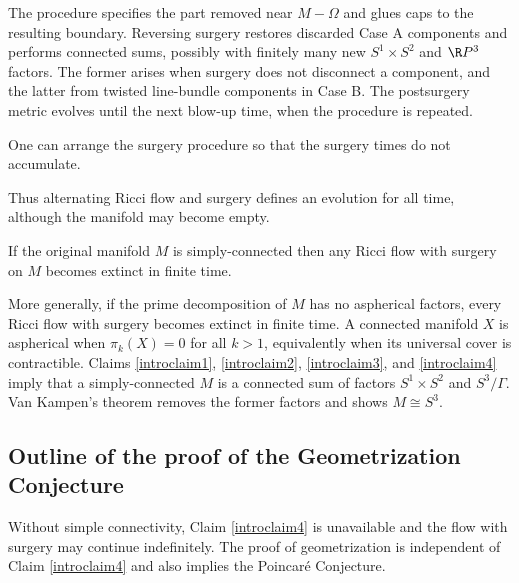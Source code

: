 The procedure specifies the part removed near $M-\Omega$ and glues caps to
the resulting boundary.  Reversing surgery restores discarded Case A
components and performs connected sums, possibly with finitely many new
$S^1\times S^2$ and $\R P^3$ factors.  The former arises when surgery does not
disconnect a component, and the latter from twisted line-bundle components
in Case B.  The postsurgery metric evolves until the next blow-up time, when
the procedure is repeated.

\begin{proposition}
  \label{prop:kl-overview-ricci-flow-approach-manifold-geometrization-ricci-flow-surgery-proposition}
 \cite{Perelman2} \label{introclaim3}
One can arrange the surgery procedure so that the surgery times do not
accumulate.
\end{proposition}

Thus alternating Ricci flow and surgery defines an evolution for all time,
although the manifold may become empty.

\begin{proposition}
  \label{prop:kl-overview-ricci-flow-approach-manifold-geometrization-ricci-flow-surgery-proposition-4}
 \cite{Colding-Minicozzi,Colding-Minicozzi2,Perelman3}
\label{introclaim4}
If the original manifold $M$ is simply-connected then any Ricci flow with
surgery on $M$ becomes extinct in finite time.
\end{proposition}

More generally, if the prime decomposition of $M$ has no aspherical factors,
every Ricci flow with surgery becomes extinct in finite time.  A connected
manifold $X$ is aspherical when $\pi_k(X)=0$ for all $k>1$, equivalently when
its universal cover is contractible.  Claims \ref{introclaim1},
\ref{introclaim2}, \ref{introclaim3}, and \ref{introclaim4} imply that a
simply-connected $M$ is a connected sum of factors $S^1\times S^2$ and
$S^3/\Gamma$.  Van Kampen's theorem removes the former factors and shows
$M\cong S^3$.

\subsection{Outline of the proof of the Geometrization Conjecture}

Without simple connectivity, Claim \ref{introclaim4} is unavailable and the
flow with surgery may continue indefinitely.  The proof of geometrization is
independent of Claim \ref{introclaim4} and also implies the Poincar\'e
Conjecture.

